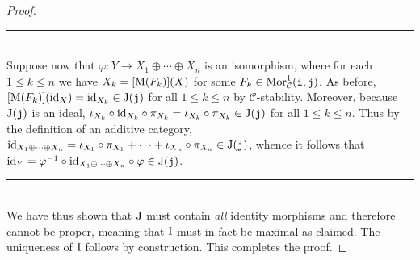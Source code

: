 \begin{proof}
\begin{center}
\rule{0.5\linewidth}{1pt}
\end{center}
\noindent\\[-\baselineskip]
\noindent Suppose now that $\varphi : Y \to X_1 \oplus \cdots \oplus X_n$ is an isomorphism, where for each  $1 \leq k \leq n$ we have $X_k = [\textup{M}(F_k)](X)$ for some $F_k \in \textnormal{Mor}_\mathcal{C}^1(\textnormal{\texttt{i}}, \textnormal{\texttt{j}})$. As before, $[\textup{M}(F_k)](\textup{id}_X) = \textup{id}_{X_k} \in \textup{J}(\textnormal{\texttt{j}})$ for all $1 \leq k \leq n$ by $\mathscr{C}$-stability. Moreover, because $\textup{J}(\textnormal{\texttt{j}})$ is an ideal, $\iota_{X_k} \circ \textup{id}_{X_k} \circ \pi_{X_k} = \iota_{X_k} \circ \pi_{X_k} \in \textup{J}(\textnormal{\texttt{j}})$ for all $1 \leq k \leq n$. Thus by the definition of an additive category, $\textup{id}_{X_1 \oplus \cdots \oplus X_n} = \iota_{X_1} \circ \pi_{X_1} + \cdots + \iota_{X_n} \circ \pi_{X_n} \in \textup{J}(\textnormal{\texttt{j}})$, whence it follows that $\textup{id}_Y = \varphi^{-1} \circ \textup{id}_{X_1 \oplus \cdots \oplus X_n} \circ \varphi \in \textup{J}(\textnormal{\texttt{j}})$.\\[-1.5\baselineskip]
\begin{center}
\rule{0.5\linewidth}{1pt}
\end{center}
\noindent\\[-\baselineskip]
\noindent We have thus shown that $\textup{J}$ must contain {\em all} identity morphisms and therefore cannot be proper, meaning that $\textup{I}$ must in fact be maximal as claimed. The uniqueness of $\textup{I}$ follows by construction. This completes the proof.
\end{proof}\\


